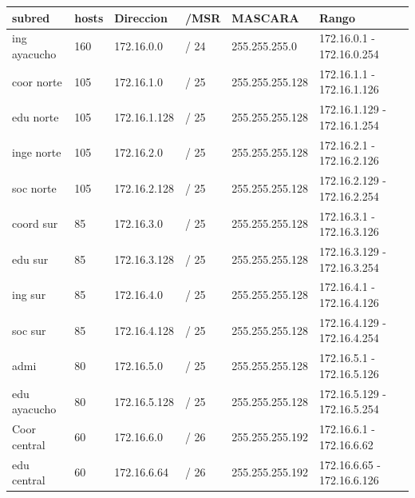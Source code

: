 \begin{table}[htbp]
\begin{tabular}{|l|l|l|l|l|l|}
\hline
\rowcolor[HTML]{34FF34} 
\textbf{subred}      & \textbf{hosts} & \textbf{Direccion} & \textbf{/MSR} & \textbf{MASCARA} & \textbf{Rango}              \\ \hline
ing ayacucho         & 160            & 172.16.0.0         & / 24          & 255.255.255.0    & 172.16.0.1 - 172.16.0.254   \\ \hline
coor norte           & 105            & 172.16.1.0         & / 25          & 255.255.255.128  & 172.16.1.1 - 172.16.1.126   \\ \hline
edu norte      & 105            & 172.16.1.128       & / 25          & 255.255.255.128  & 172.16.1.129 - 172.16.1.254 \\ \hline
inge norte           & 105            & 172.16.2.0         & / 25          & 255.255.255.128  & 172.16.2.1 - 172.16.2.126   \\ \hline
soc norte         & 105            & 172.16.2.128       & / 25          & 255.255.255.128  & 172.16.2.129 - 172.16.2.254 \\ \hline
coord sur            & 85             & 172.16.3.0         & / 25          & 255.255.255.128  & 172.16.3.1 - 172.16.3.126   \\ \hline
edu sur        & 85             & 172.16.3.128       & / 25          & 255.255.255.128  & 172.16.3.129 - 172.16.3.254 \\ \hline
ing sur              & 85             & 172.16.4.0         & / 25          & 255.255.255.128  & 172.16.4.1 - 172.16.4.126   \\ \hline
soc sur         & 85             & 172.16.4.128       & / 25          & 255.255.255.128  & 172.16.4.129 - 172.16.4.254 \\ \hline
admi                 & 80             & 172.16.5.0         & / 25          & 255.255.255.128  & 172.16.5.1 - 172.16.5.126   \\ \hline
edu ayacucho   & 80             & 172.16.5.128       & / 25          & 255.255.255.128  & 172.16.5.129 - 172.16.5.254 \\ \hline
Coor central & 60             & 172.16.6.0         & / 26          & 255.255.255.192  & 172.16.6.1 - 172.16.6.62    \\ \hline
edu central    & 60             & 172.16.6.64        & / 26          & 255.255.255.192  & 172.16.6.65 - 172.16.6.126  \\ \hline

\end{tabular}
\end{table}
